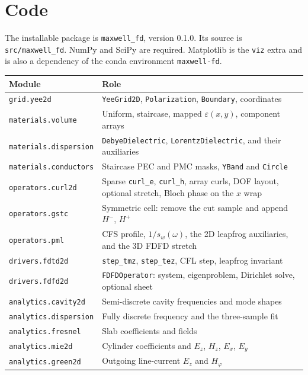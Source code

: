 \documentclass[11pt,a4paper]{article}
\begin{document}
\section{Code}
\label{sec:code}

The installable package is \texttt{maxwell\_fd}, version 0.1.0. Its source
is \texttt{src/maxwell\_fd}. NumPy and SciPy are required. Matplotlib is
the \texttt{viz} extra and is also a dependency of the conda environment
\texttt{maxwell-fd}.

\begin{center}
\small
\begin{tabular}{@{}lp{9.2cm}@{}}
\toprule
Module & Role\\
\midrule
\texttt{grid.yee2d}
& \texttt{YeeGrid2D}, \texttt{Polarization}, \texttt{Boundary}, coordinates\\
\texttt{materials.volume}
& Uniform, staircase, mapped $\varepsilon(x,y)$, component arrays\\
\texttt{materials.dispersion}
& \texttt{DebyeDielectric}, \texttt{LorentzDielectric}, and their auxiliaries\\
\texttt{materials.conductors}
& Staircase PEC and PMC masks, \texttt{YBand} and \texttt{Circle}\\
\texttt{operators.curl2d}
& Sparse \texttt{curl\_e}, \texttt{curl\_h}, array curls, DOF layout, optional stretch, Bloch phase on the $x$ wrap\\
\texttt{operators.gstc}
& Symmetric cell: remove the cut sample and append $H^-$, $H^+$\\
\texttt{operators.pml}
& CFS profile, $1/s_w(\omega)$, the 2D leapfrog auxiliaries, and the 3D FDFD stretch\\
\texttt{drivers.fdtd2d}
& \texttt{step\_tmz}, \texttt{step\_tez}, CFL step, leapfrog invariant\\
\texttt{drivers.fdfd2d}
& \texttt{FDFDOperator}: system, eigenproblem, Dirichlet solve, optional sheet\\
\texttt{analytics.cavity2d}
& Semi-discrete cavity frequencies and mode shapes\\
\texttt{analytics.dispersion}
& Fully discrete frequency and the three-sample fit\\
\texttt{analytics.fresnel}
& Slab coefficients and fields\\
\texttt{analytics.mie2d}
& Cylinder coefficients and $E_z$, $H_z$, $E_x$, $E_y$\\
\texttt{analytics.green2d}
& Outgoing line-current $E_z$ and $H_\varphi$\\

\end{tabular}
\end{center}
\end{document}
